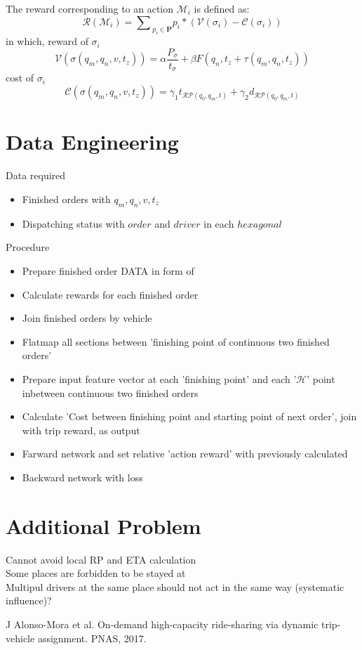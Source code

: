 \documentclass{article}
\begin{document}
\noindent
The reward corresponding to an action $\mathcal{M}_i$ is defined as:
\begin{equation}
    \label{reward}
    \mathcal{R}(\mathcal{M}_i) = {‎‎\sum}_{p_i\in \mathbf{P}}p_i*
        (\mathcal{V}(\sigma_i)-\mathcal{C}(\sigma_i))
\end{equation}
in which, reward of $\sigma_i$
\begin{equation}
    \mathcal{V}(\sigma(q_m,q_n,v,t_z)) = \alpha\frac{P_{\sigma}}{t_{\sigma}} + 
        \beta F(q_n,t_z+\tau(q_m,q_n,t_z))
\end{equation}
cost of $\sigma_i$
\begin{equation}
    \mathcal{C}(\sigma(q_m,q_n,v,t_z)) = \gamma_1 t_{\mathcal{RP}(q_0,q_m,t)} +
        \gamma_2 d_{\mathcal{RP}(q_0,q_m,t)}
\end{equation}

\section{Data Engineering}
Data required
\begin{itemize}
    \item Finished orders with $q_m,q_n,v,t_z$
    \item Dispatching status with $order$ and $driver$ in each $hexagonal$
\end{itemize}

\noindent
Procedure
\begin{itemize}
    \item Prepare finished order DATA in form of 
    \item Calculate rewards for each finished order
    \item Join finished orders by vehicle
    \item Flatmap all sections between 'finishing point of continuous two finished orders'
    \item Prepare input feature vector at each 'finishing point' and each '$\mathcal{H}$' point inbetween continuous two finished orders
    \item Calculate 'Cost between finishing point and starting point of next order', join with trip reward, as output
    \item Farward network and set relative 'action reward' with previously calculated
    \item Backward network with loss
\end{itemize}


\section{Additional Problem}
Cannot avoid local RP and ETA calculation\\
Some places are forbidden to be stayed at\\
Multipul drivers at the same place should not act in the same way (systematic influence)?\\


\begin{thebibliography}{1}

   J Alonso-Mora et al. On-demand high-capacity ride-sharing via dynamic trip-vehicle assignment. PNAS, 2017.

\end{thebibliography}
\end{document}
